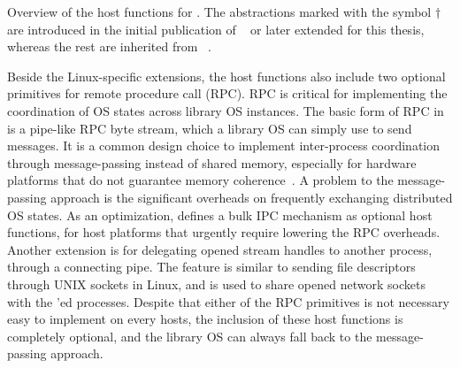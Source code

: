 \begin{table}[htp!]
\centering

\caption{Overview of the host functions for \graphene{}. The abstractions marked with the symbol $\dagger$ are introduced in the initial publication of \graphene{}~\cite{tsai14graphene} or later extended for this thesis, whereas the rest are inherited from \drawbridge{}~\cite{porter11drawbridge}.}
\label{tab:overview:abi}
\end{table}




Beside the Linux-specific extensions,
the host functions also include two optional primitives for remote procedure call (RPC).
RPC is critical for implementing the coordination of OS states
across library OS instances.
The basic form of RPC in \graphene{} is a pipe-like RPC byte stream, which a library OS can simply use to send messages.
It is a common design choice
to implement inter-process coordination through message-passing
instead of shared memory, especially for hardware platforms that do not guarantee memory coherence~\cite{baumann09barrelfish}.
A problem to the message-passing approach is the significant overheads
on frequently exchanging distributed OS states.
As an optimization, \graphene{} defines a bulk IPC mechanism
as optional host functions,
for host platforms that urgently require lowering the RPC overheads.
Another extension is for
delegating opened stream handles to another process, through a connecting pipe.
The feature is similar to sending file descriptors
through UNIX sockets in Linux, and is used to share opened network sockets with the 'ed processes.
Despite that either of the RPC primitives
is not necessary easy to implement on every hosts, the inclusion of these host functions is completely optional, and the library OS can always fall back to the message-passing approach.



